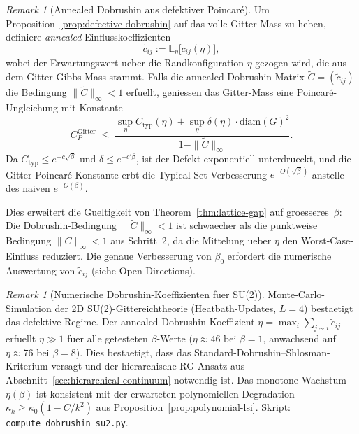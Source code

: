 \documentclass[12pt,a4paper]{article}
\theoremstyle{definition}
\theoremstyle{plain}
\theoremstyle{remark}
\newtheorem{remark}[definition]{Remark}
\begin{document}
\begin{remark}[Annealed Dobrushin aus defektiver Poincar\'e]\label{rem:annealed-dobrushin}
Um Proposition~\ref{prop:defective-dobrushin} auf das volle Gitter-Mass zu heben, definiere \emph{annealed} Einflusskoeffizienten
\begin{equation}\label{eq:annealed-influence}
  \tilde{c}_{ij} := \mathbb{E}_\eta\bigl[c_{ij}(\eta)\bigr],
\end{equation}
wobei der Erwartungswert ueber die Randkonfiguration $\eta$ gezogen wird, die aus dem Gitter-Gibbs-Mass stammt. Falls die annealed Dobrushin-Matrix $\tilde{C} = (\tilde{c}_{ij})$ die Bedingung $\|\tilde{C}\|_\infty < 1$ erfuellt, geniessen das Gitter-Mass eine Poincar\'e-Ungleichung mit Konstante
\begin{equation}\label{eq:annealed-poincare}
  C_P^{\mathrm{Gitter}} \;\leq\; \frac{\sup_\eta C_{\mathrm{typ}}(\eta) + \sup_\eta \delta(\eta) \cdot \mathrm{diam}(G)^2}{1 - \|\tilde{C}\|_\infty}.
\end{equation}
Da $C_{\mathrm{typ}} \leq e^{-c\sqrt{\beta}}$ und $\delta \leq e^{-c'\beta}$, ist der Defekt exponentiell unterdrueckt, und die Gitter-Poincar\'e-Konstante erbt die Typical-Set-Verbesserung $e^{-O(\sqrt{\beta})}$ anstelle des naiven $e^{-O(\beta)}$.

Dies erweitert die Gueltigkeit von Theorem~\ref{thm:lattice-gap} auf groesseres~$\beta$: Die Dobrushin-Bedingung $\|\tilde{C}\|_\infty < 1$ ist schwaecher als die punktweise Bedingung $\|C\|_\infty < 1$ aus Schritt~2, da die Mittelung ueber $\eta$ den Worst-Case-Einfluss reduziert. Die genaue Verbesserung von $\beta_0$ erfordert die numerische Auswertung von $\tilde{c}_{ij}$ (siehe Open Directions).
\end{remark}

\begin{remark}[Numerische Dobrushin-Koeffizienten fuer SU(2)]
\label{rem:dobrushin-numerics}
Monte-Carlo-Simulation der 2D SU(2)-Gittereichtheorie (Heatbath-Updates, $L=4$) bestaetigt das defektive Regime. Der annealed Dobrushin-Koeffizient $\eta = \max_i \sum_{j \sim i} \tilde{c}_{ij}$ erfuellt $\eta \gg 1$ fuer alle getesteten $\beta$-Werte ($\eta \approx 46$ bei $\beta=1$, anwachsend auf $\eta \approx 76$ bei $\beta=8$). Dies bestaetigt, dass das Standard-Dobrushin--Shlosman-Kriterium versagt und der hierarchische RG-Ansatz aus Abschnitt~\ref{sec:hierarchical-continuum} notwendig ist. Das monotone Wachstum $\eta(\beta)$ ist konsistent mit der erwarteten polynomiellen Degradation $\kappa_k \geq \kappa_0(1 - C/k^2)$ aus Proposition~\ref{prop:polynomial-lsi}. Skript: \texttt{compute\_dobrushin\_su2.py}.
\end{remark}
\end{document}
